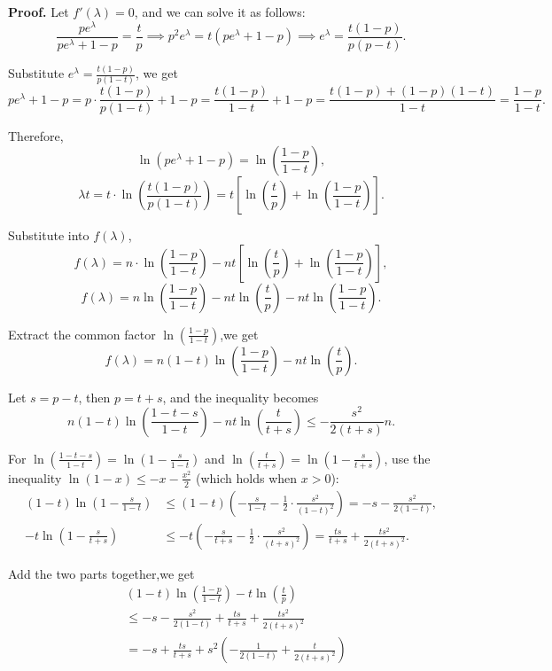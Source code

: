 \documentclass[a4paper, 11pt]{article}
\newenvironment{solution}
    {\textbf{Proof.}}
    {}
\begin{document}
\begin{solution}
Let \( f'(\lambda) = 0 \), and we can solve it as follows:
$$
\frac{pe^\lambda}{pe^\lambda + 1 - p} = \frac{t}{p} \implies p^2e^\lambda = t(pe^\lambda + 1 - p) \implies e^\lambda = \frac{t(1 - p)}{p(p - t)}.
$$

Substitute \( e^\lambda = \frac{t(1 - p)}{p(1 - t)} \), we get
$$
pe^\lambda + 1 - p = p \cdot \frac{t(1 - p)}{p(1 - t)} + 1 - p = \frac{t(1 - p)}{1 - t} + 1 - p =\frac{t(1 - p)+(1 - p)(1 - t)}{1 - t}=\frac{1 - p}{1 - t}.
$$

Therefore,
$$
\ln\left(pe^\lambda + 1 - p\right)=\ln\left(\frac{1 - p}{1 - t}\right),
$$
$$
\lambda t=t\cdot\ln\left(\frac{t(1 - p)}{p(1 - t)}\right)=t\left[\ln\left(\frac{t}{p}\right)+\ln\left(\frac{1 - p}{1 - t}\right)\right].
$$

Substitute into \( f(\lambda) \),
$$
f(\lambda)=n\cdot\ln\left(\frac{1 - p}{1 - t}\right)-nt\left[\ln\left(\frac{t}{p}\right)+\ln\left(\frac{1 - p}{1 - t}\right)\right],
$$
$$
f(\lambda)=n\ln\left(\frac{1 - p}{1 - t}\right)-nt\ln\left(\frac{t}{p}\right)-nt\ln\left(\frac{1 - p}{1 - t}\right).
$$

Extract the common factor \( \ln\left(\frac{1 - p}{1 - t}\right) \),we get
$$
f(\lambda)=n(1 - t)\ln\left(\frac{1 - p}{1 - t}\right)-nt\ln\left(\frac{t}{p}\right).
$$

Let \( s = p - t \), then \( p = t + s \), and the inequality becomes
$$
n(1 - t)\ln\left( \frac{1 - t - s}{1 - t} \right) - nt\ln\left( \frac{t}{t + s} \right) \leq -\frac{s^2}{2(t + s)}n.
$$

For \( \ln\left( \frac{1 - t - s}{1 - t} \right) = \ln\left( 1 - \frac{s}{1 - t} \right) \) and \( \ln\left( \frac{t}{t + s} \right) = \ln\left( 1 - \frac{s}{t + s} \right) \), use the inequality \( \ln(1 - x) \leq -x - \frac{x^2}{2} \) (which holds when \( x > 0 \)):
$$
\begin{align*}
	(1 - t)\ln\left( 1 - \frac{s}{1 - t} \right) &\leq (1 - t)\left( -\frac{s}{1 - t} - \frac{1}{2} \cdot \frac{s^2}{(1 - t)^2} \right) = -s - \frac{s^2}{2(1 - t)} ,\\
	-t\ln\left( 1 - \frac{s}{t + s} \right) &\leq -t\left( -\frac{s}{t + s} - \frac{1}{2} \cdot \frac{s^2}{(t + s)^2} \right) = \frac{ts}{t + s} + \frac{ts^2}{2(t + s)^2}.
\end{align*}
$$

Add the two parts together,we get
$$
\begin{align*}
	&(1 - t)\ln\left( \frac{1 - p}{1 - t} \right) - t\ln\left( \frac{t}{p} \right) \\
	&\leq -s - \frac{s^2}{2(1 - t)} + \frac{ts}{t + s} + \frac{ts^2}{2(t + s)^2} \\
	&= -s + \frac{ts}{t + s} + s^2\left( -\frac{1}{2(1 - t)} + \frac{t}{2(t + s)^2} \right)
\end{align*}
$$


\end{solution}
\end{document}
